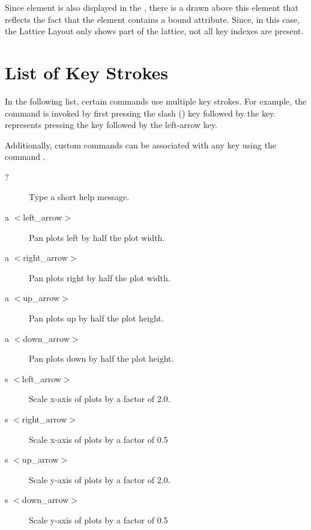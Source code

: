 {Since element  is also displayed in the , there is a  drawn
above this element that reflects the fact that the element contains a bound attribute. Since, in
this case, the Lattice Layout only shows part of the lattice, not all key indexes are present.


\section{List of Key Strokes}
\label{s:keys}

In the following list, certain commands use multiple key strokes. For example, the  command
is invoked by first pressing the slash () key followed by the  key.  represents pressing the  key followed by the left-arrow key.

Additionally, custom commands can be associated with any key using the  command
.

\begin{description}
\item[?]
Type a short help message.

\item[a $<$left\_arrow$>$]
Pan plots left by half the plot width.

\item[a $<$right\_arrow$>$]
Pan plots right by half the plot width.

\item[a $<$up\_arrow$>$]
Pan plots up by half the plot height.

\item[a $<$down\_arrow$>$]
Pan plots down by half the plot height.

\item[s $<$left\_arrow$>$]
Scale x-axis of plots by a factor of 2.0.

\item[s $<$right\_arrow$>$]
Scale x-axis of plots by a factor of 0.5

\item[s $<$up\_arrow$>$]
Scale y-axis of plots by a factor of 2.0.

\item[s $<$down\_arrow$>$]
Scale y-axis of plots by a factor of 0.5



\end{description}}
